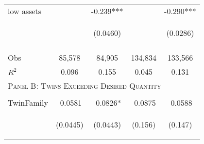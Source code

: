 \documentclass{article}[11pt,subeqn]
\begin{document}
\begin{spacing}{1.5}
\begin{table}
\begin{center}
\begin{tabular}{lcccc}
low assets	&		&	-0.239***	&		&	-0.290***	\\   
\vspace{4pt}	& \begin{footnotesize}		\end{footnotesize} & \begin{footnotesize}	(0.0460)	\end{footnotesize} & \begin{footnotesize}		\end{footnotesize} & \begin{footnotesize}	(0.0286)	\end{footnotesize} \\
\begin{footnotesize}\end{footnotesize}&\begin{footnotesize}\end{footnotesize}&\begin{footnotesize}\end{footnotesize}&\begin{footnotesize}\end{footnotesize}&\begin{footnotesize}\end{footnotesize}\\									
Obs	&	85,578	&	84,905	&	134,834	&	133,566	\\   
$R^2$	&	0.096	&	0.155	&	0.045	&	0.131	\\   \midrule
\multicolumn{5}{l}{\textsc{Panel B: Twins Exceeding Desired Quantity}} \\
\begin{footnotesize}\end{footnotesize}&\begin{footnotesize}\end{footnotesize}&\begin{footnotesize}\end{footnotesize}&\begin{footnotesize}\end{footnotesize}&\begin{footnotesize}\end{footnotesize}\\									
TwinFamily	&	-0.0581	&	-0.0826*	&	-0.0875	&	-0.0588	\\   
\vspace{4pt}	& \begin{footnotesize}	(0.0445)	\end{footnotesize} & \begin{footnotesize}	(0.0443)	\end{footnotesize} & \begin{footnotesize}	(0.156)	\end{footnotesize} & \begin{footnotesize}	(0.147)	\end{footnotesize} \\

\end{tabular}
\end{center}
\end{table}
\end{spacing}
\end{document}
